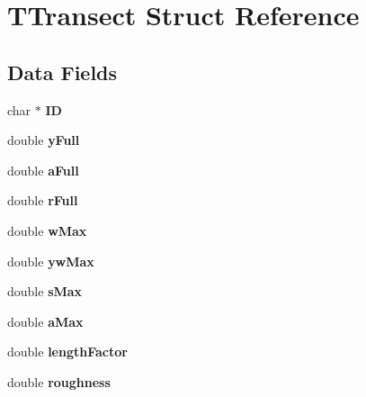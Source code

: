 \hypertarget{struct_t_transect}{}\section{T\+Transect Struct Reference}
\label{struct_t_transect}
\subsection*{Data Fields}
\begin{DoxyCompactItemize}
\item 
\mbox{\label{struct_t_transect_a63756a4a33a8c806e584babb52907653}} 
char $\ast$ {\bfseries ID}
\item 
\mbox{\label{struct_t_transect_acb88aefbbf3fdd60eb4b725c342d17e3}} 
double {\bfseries y\+Full}
\item 
\mbox{\label{struct_t_transect_a9d2890c5999b2fbb9a446f7c101a5b6d}} 
double {\bfseries a\+Full}
\item 
\mbox{\label{struct_t_transect_adc6257ea0cf58dc33e2bd95ba6e72e44}} 
double {\bfseries r\+Full}
\item 
\mbox{\label{struct_t_transect_a378b132b872409c20a0a561c988bbb37}} 
double {\bfseries w\+Max}
\item 
\mbox{\label{struct_t_transect_ad7d5a780e668bbc84d9eaca258701b8f}} 
double {\bfseries yw\+Max}
\item 
\mbox{\label{struct_t_transect_a00e62bf08cf9aebdc0f40da1c6ea8595}} 
double {\bfseries s\+Max}
\item 
\mbox{\label{struct_t_transect_a3abaa4978bd7df5255c96806e3ddc262}} 
double {\bfseries a\+Max}
\item 
\mbox{\label{struct_t_transect_aad301e7f5b8bf2fad507ea293a45005e}} 
double {\bfseries length\+Factor}
\item 
\mbox{\label{struct_t_transect_aae6a29bf1aea8336238154d7b4b95994}} 
double {\bfseries roughness}

\end{DoxyCompactItemize}
